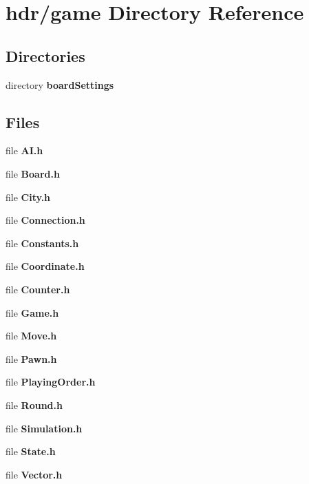 \section{hdr/game Directory Reference}
\label{dir_f9ac9697e996c45f503885d8d672ac41}
\subsection*{Directories}
\begin{DoxyCompactItemize}
\item 
directory {\bf board\-Settings}
\end{DoxyCompactItemize}
\subsection*{Files}
\begin{DoxyCompactItemize}
\item 
file {\bfseries A\-I.\-h}
\item 
file {\bfseries Board.\-h}
\item 
file {\bfseries City.\-h}
\item 
file {\bfseries Connection.\-h}
\item 
file {\bfseries Constants.\-h}
\item 
file {\bfseries Coordinate.\-h}
\item 
file {\bfseries Counter.\-h}
\item 
file {\bfseries Game.\-h}
\item 
file {\bfseries Move.\-h}
\item 
file {\bfseries Pawn.\-h}
\item 
file {\bfseries Playing\-Order.\-h}
\item 
file {\bfseries Round.\-h}
\item 
file {\bfseries Simulation.\-h}
\item 
file {\bfseries State.\-h}
\item 
file {\bfseries Vector.\-h}
\end{DoxyCompactItemize}
